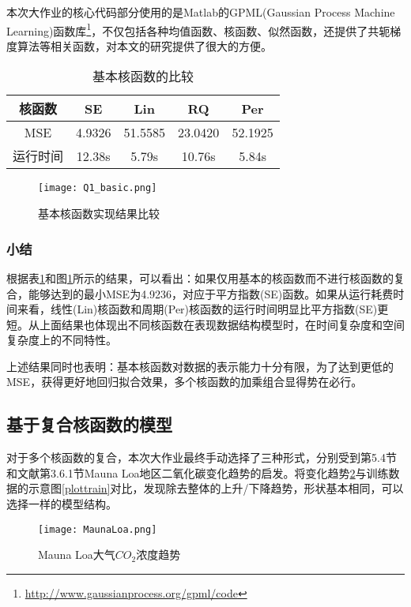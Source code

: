\documentclass[10pt,twocolumn]{article}
\begin{document}
本次大作业的核心代码部分使用的是Matlab的GPML(Gaussian Process Machine Learning)函数库\footnote{\url{http://www.gaussianprocess.org/gpml/code}}，不仅包括各种均值函数、核函数、似然函数，还提供了共轭梯度算法等相关函数，对本文的研究提供了很大的方便。

\begin{table}[!htbp]
\centering
\begin{tabular}{c|c|c|c|c}
\hline\hline
核函数 & SE & Lin & RQ & Per \\ \hline
MSE & 4.9326 & 51.5585 & 23.0420 & 52.1925 \\
运行时间 & 12.38s & 5.79s & 10.76s & 5.84s \\
\hline\hline
\end{tabular}
\caption{基本核函数的比较}
\label{q1basic}
\end{table}

\begin{figure}[!htbp]
    \centering
    \texttt{[image: Q1\_basic.png]}
    \caption{基本核函数实现结果比较}
    \label{basiccom}
\end{figure}

\subsubsection{小结}
根据表\ref{q1basic}和图\ref{basiccom}所示的结果，可以看出：如果仅用基本的核函数而不进行核函数的复合，能够达到的最小MSE为4.9236，对应于平方指数(SE)函数。如果从运行耗费时间来看，线性(Lin)核函数和周期(Per)核函数的运行时间明显比平方指数(SE)更短。从上面结果也体现出不同核函数在表现数据结构模型时，在时间复杂度和空间复杂度上的不同特性。

上述结果同时也表明：基本核函数对数据的表示能力十分有限，为了达到更低的MSE，获得更好地回归拟合效果，多个核函数的加乘组合显得势在必行。

\subsection{基于复合核函数的模型}
对于多个核函数的复合，本次大作业最终手动选择了三种形式，分别受到\cite{GPML}第5.4节和文献\cite{Auto2}第3.6.1节Mauna Loa地区二氧化碳变化趋势的启发。将变化趋势\ref{MaunaLoa}与训练数据的示意图\ref{plottrain}对比，发现除去整体的上升/下降趋势，形状基本相同，可以选择一样的模型结构。

\begin{figure}[!htbp]
    \centering
    \texttt{[image: MaunaLoa.png]}
    \caption{Mauna Loa大气$CO_{2}$浓度趋势}
    \label{MaunaLoa}
\end{figure}
\end{document}
